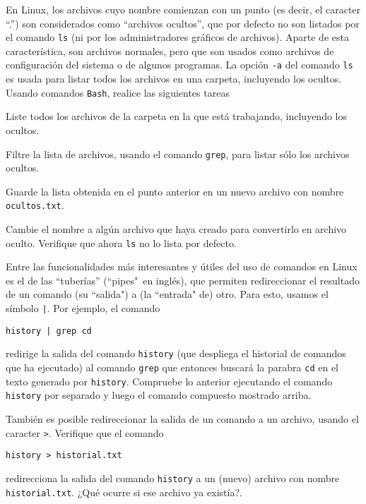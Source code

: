 \documentclass[11pt]{exam}
\begin{document}
\begin{questions}

\item En Linux, los archivos cuyo nombre comienzan con un punto (es decir, el caracter ``.'') son considerados como ``archivos ocultos'', que por defecto no son listados por el comando \texttt{ls} (ni por los administradores gráficos de archivos). Aparte de esta característica, son archivos normales, pero que son usados como archivos de configuración del sistema o de algunos programas. La opción \texttt{-a} del comando \texttt{ls} es usada para listar todos los archivos en una carpeta, incluyendo los ocultos. Usando comandos \texttt{Bash}, realice las siguientes tareas
\begin{parts}
\item Liste todos los archivos de la carpeta en la que está trabajando, incluyendo los ocultos.
\item Filtre la lista de archivos, usando el comando \texttt{grep}, para listar sólo los archivos ocultos.
\item Guarde la lista obtenida en el punto anterior en un nuevo archivo con nombre \texttt{ocultos.txt}.
\item Cambie el nombre a algún archivo que haya creado para convertirlo en archivo oculto. Verifique que ahora \texttt{ls} no lo lista por defecto.
\end{parts}

\item Entre las funcionalidades más interesantes y útiles del uso de comandos en Linux es el de las ``tuberías'' (``pipes"\ en inglés), que permiten redireccionar el resultado de un comando (su ``salida") a (la ``entrada" de) otro. Para esto, usamos el símbolo \texttt{|}. Por ejemplo, el comando
\begin{verbatim}
history | grep cd
\end{verbatim}
redirige la salida del comando \texttt{history} (que despliega el historial de comandos que ha ejecutado) al comando \texttt{grep} que entonces buscará la parabra \texttt{cd} en el texto generado por \texttt{history}. Compruebe lo anterior ejecutando el comando \texttt{history} por separado y luego el comando compuesto mostrado arriba.

\item También es posible redireccionar la salida de un comando a un archivo, usando el caracter \texttt{>}. Verifique que el comando
\begin{verbatim}
history > historial.txt
\end{verbatim}
redirecciona la salida del comando \texttt{history} a un (nuevo) archivo con nombre \texttt{historial.txt}. ¿Qué ocurre si ese archivo ya existía?.


\end{questions}
\end{document}
